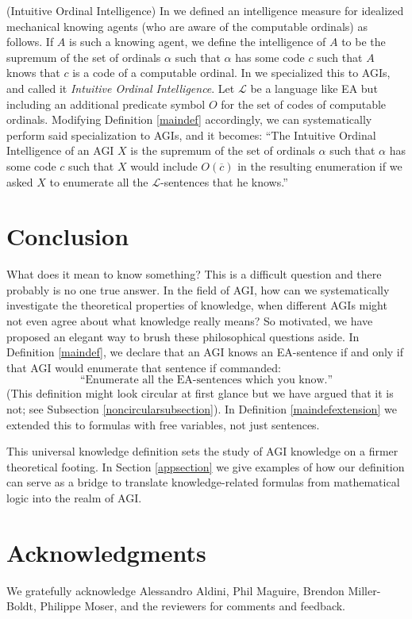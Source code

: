 \documentclass[runningheads]{llncs}
\begin{document}
\begin{example}
  (Intuitive Ordinal Intelligence) In \cite{ioi1} we defined
  an intelligence measure for idealized mechanical knowing agents (who are
  aware of the computable ordinals) as follows.
  If $A$ is such a knowing agent, we define the intelligence of $A$ to be
  the supremum of the set of ordinals $\alpha$ such that
  $\alpha$ has some code $c$ such that $A$ knows that $c$ is a code of
  a computable ordinal. In \cite{ioi2} we specialized this to AGIs, and
  called it \emph{Intuitive Ordinal Intelligence}.
  Let $\mathscr L$ be a language like EA but including an additional
  predicate symbol $O$ for the set of codes of computable ordinals.
  Modifying Definition \ref{maindef} accordingly,
  we can systematically perform said specialization to AGIs, and it becomes:
  ``The Intuitive Ordinal
  Intelligence of an AGI $X$ is the supremum of the set of ordinals $\alpha$
  such that $\alpha$ has some code $c$ such that $X$ would include $O(\overline c)$
  in the resulting enumeration if we asked $X$ to enumerate all the
  $\mathscr L$-sentences that he knows.''
\end{example}

\section{Conclusion}
\label{conclusionsection}

What does it mean to know something? This is a difficult question and there probably
is no one true answer. In the field of AGI, how can we systematically investigate
the theoretical properties of knowledge, when different AGIs might not even agree
about what knowledge really means? So motivated, we have proposed
an elegant way to brush these philosophical questions aside. In Definition \ref{maindef},
we declare that an AGI knows an EA-sentence if and
only if that AGI would enumerate that sentence if commanded:
  \[
  \text{``Enumerate all the EA-sentences which you know.''}
  \]
(This definition might look circular at first glance but we have argued that it is
not; see Subsection \ref{noncircularsubsection}).
In Definition \ref{maindefextension}
we extended this to formulas with free variables, not just sentences.

This universal knowledge definition sets the study of AGI knowledge
on a firmer theoretical footing. In Section \ref{appsection} we give examples
of how our definition can serve as a bridge to translate knowledge-related
formulas from mathematical logic into the realm of AGI.

\section*{Acknowledgments}

We gratefully acknowledge Alessandro Aldini, Phil Maguire, Brendon Miller-Boldt,
Philippe Moser, and the reviewers for
comments and feedback.



\end{document}
